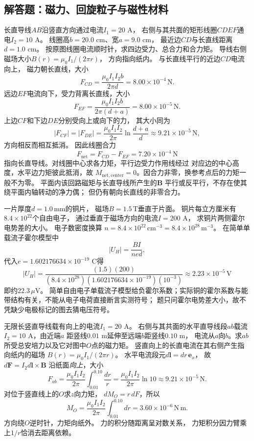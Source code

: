 \subsection{解答题：磁力、回旋粒子与磁性材料}

\problemtext 长直导线$AB$沿竖直方向通过电流$I_1=20$ A，
右侧与其共面的矩形线圈$CDEF$通电$I_2=10$ A。
线圈高$b=20.0$ cm、宽$a=9.0$ cm，
最近边$CD$与长直线距离$d=1.0$ cm。
按原图线圈电流顺时针，求四边受力、总合力和合力矩。
\workings
导线右侧磁场大小$B(r)=\mu_0I_1/(2\pi r)$，
方向指向纸内。
与长直线平行的近边$CD$电流向上，
磁力朝长直线，大小
\[
\boxed{F_{CD}=\frac{\mu_0I_1I_2b}{2\pi d}
=8.00\times10^{-4}\,\mathrm N}.
\]
远边$EF$电流向下，受力背离长直线，大小
\[
\boxed{F_{EF}=\frac{\mu_0I_1I_2b}{2\pi(d+a)}
=8.00\times10^{-5}\,\mathrm N}.
\]
上边$CF$和下边$DE$分别受向上或向下的力，
其大小同为
\[
\boxed{|F_{CF}|=|F_{DE}|=
\frac{\mu_0I_1I_2}{2\pi}
\ln\frac{d+a}{d}
\approx9.21\times10^{-5}\,\mathrm N},
\]
方向相反而相互抵消。
因此线圈合力
\[
\boxed{F_{\mathrm{net}}=F_{CD}-F_{EF}
=7.20\times10^{-4}\,\mathrm N}
\]
指向长直导线。对线圈中心求各力矩，平行边受力作用线经过
对应边的中心高度，水平边力矩彼此抵消，故
$\boxed{M_{\mathrm{net,center}}=0}$。因合力非零，换参考点后的力矩一般不为零。
\crosscheck 平面内该回路磁矩与长直导线所产生的$\bm B$
平行或反平行，不存在使其绕平面内轴转动的净力偶；
但仍有朝向长直线的非零合力。

\problemtext 一片厚度$d=1.0\,\mathrm{mm}$的铜片，
磁场$B=1.5\,\mathrm T$垂直于片面。
铜片每立方厘米有$8.4\times10^{22}$个自由电子，
通过垂直于磁场方向的电流$I=200$ A，
求铜片两侧霍尔电势差的大小。
\workings
电子数密度换算
$n=8.4\times10^{22}\,\mathrm{cm^{-3}}
=8.4\times10^{28}\,\mathrm{m^{-3}}$。
在简单单载流子霍尔模型中
\[
|U_H|=\frac{BI}{n e d},
\]
代入$e=1.602176634\times10^{-19}$ C得
\[
\boxed{|U_H|=\frac{(1.5)(200)}
 {(8.4\times10^{28})(1.602176634\times10^{-19})(10^{-3})}
\approx2.23\times10^{-5}\,\mathrm V}
\]
即约$22.3\,\mu\mathrm V$。
\crosscheck 简单自由电子单载流子模型给负霍尔系数；实际铜的霍尔系数与能带结构有关，不能从电子电荷直接断言实测符号；
题只问霍尔电势差大小，故不凭缺少电极标记的图去猜电压符号。

\problemtext 无限长竖直导线载有向上的电流$I_1=20$ A。
右侧与其共面的水平直导线段$ab$载流$I_2=10$ A，由近端$a$
距竖线$0.01$ m延伸至远端$b$距竖线$0.10$ m，
电流从$a$向$b$。求$ab$所受总安培力以及它对图中$O$点的磁力矩。
\workings
竖直向上的长直电流在其右侧产生指向纸内的磁场
$B(r)=\mu_0I_1/(2\pi r)$。
水平电流段元$d\bm l=dr\,\bm e_x$，
故$d\bm F=I_2d\bm l\times\bm B$
沿纸面\emph{向上}，大小
\[
\boxed{F_{ab}=\frac{\mu_0I_1I_2}{2\pi}
\int_{0.01}^{0.10}\frac{dr}{r}
=\frac{\mu_0I_1I_2}{2\pi}\ln10
\approx9.21\times10^{-5}\,\mathrm N}.
\]
对位于竖直线上的$O$求$z$向力矩，
$dM_O=r\,dF$，所以
\[
\boxed{M_O=\frac{\mu_0I_1I_2}{2\pi}
\int_{0.01}^{0.10}dr
=3.60\times10^{-6}\,\mathrm{N\,m}}.
\]
方向绕$O$逆时针，力矩向纸外。
\crosscheck 力的积分随距离呈对数关系，
力矩积分因力臂乘上$1/r$恰消去距离依赖。

